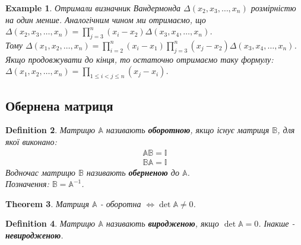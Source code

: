 \documentclass[a4paper, 10pt]{article}
\theoremstyle{theoremdd}
\newtheorem{theorem}{Theorem}[subsection]
\newtheorem{definition}[theorem]{Definition}
\newtheorem{example}[theorem]{Example}
\begin{document}
\begin{example}
Отримали визначник Вандермонда $\Delta (x_2,x_3,\dots,x_n)$ розмірністю на один менше. Аналогічним чином ми отримаємо, що $\Delta (x_2,x_3,\dots,x_n) = \displaystyle\prod_{j=3}^n (x_i-x_2) \Delta (x_3,x_4,\dots,x_n)$.\\
Тому $\Delta (x_1,x_2,\dots,x_n) = \displaystyle\prod_{i=2}^n (x_i-x_1) \prod_{j=3}^n (x_j-x_2) \Delta (x_3,x_4,\dots,x_n)$.\\
Якщо продовжувати до кінця, то остаточно отримаємо таку формулу:\\
$\Delta (x_1,x_2,\dots,x_n) = \displaystyle\prod_{1 \leq i<j \leq n} (x_j-x_i)$.
\end{example}

\subsection{Обернена матриця}
\begin{definition}
Матрицю $\mathbb{A}$ називають \textbf{оборотною}, якщо існує матриця $\mathbb{B}$, для якої виконано:
\begin{align*}
\mathbb{A} \mathbb{B} = \mathbb{I} \\
\mathbb{B} \mathbb{A} = \mathbb{I}
\end{align*}
Водночас матрицю $\mathbb{B}$ називають \textbf{оберненою} до $\mathbb{A}$.\\
Позначення: $\mathbb{B} = \mathbb{A}^{-1}$.
\end{definition}

\begin{theorem}
Матриця $\mathbb{A}$ - оборотна $\iff \det \mathbb{A} \neq 0$.
\end{theorem}

\begin{definition}
Матрицю $\mathbb{A}$ називають \textbf{виродженою}, якщо $\det \mathbb{A} = 0$. Інакше - \textbf{невиродженою}.
\end{definition}
\end{document}
